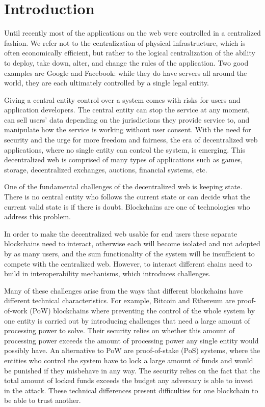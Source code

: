 \section{Introduction}
Until recently most of the applications on the web were controlled in a centralized fashion.
We refer not to the centralization of physical infrastructure, which is often economically efficient, but rather to the logical centralization of the ability to deploy, take down, alter, and change the rules of the application.
Two good examples are Google and Facebook: while they do have servers all around the world, they are each ultimately controlled by a single legal entity.

Giving a central entity control over a system comes with risks for users and application developers.
The central entity can stop the service at any moment, can sell users' data depending on the jurisdictions they provide service to, and manipulate how the service is working without user consent.
With the need for security and the urge for more freedom and fairness, the era of decentralized web applications, where no single entity can control the system, is emerging.
This decentralized web is comprised of many types of applications such as games, storage, decentralized exchanges, auctions, financial systems, etc.

One of the fundamental challenges of the decentralized web is keeping state. There is no central entity who follows the current state or can decide what the current valid state is if there is doubt.
Blockchains are one of technologies who address this problem.

In order to make the decentralized web usable for end users these separate blockchains need to interact, otherwise each will become isolated and not adopted by as many users, and the sum functionality of the system will be insufficient to compete with the centralized web.
However, to interact different chains need to build in interoperability mechanisms, which introduces challenges.

Many of these challenges arise from the ways that different blockchains have different technical characteristics. For example, Bitcoin and Ethereum are proof-of-work (PoW) blockchains where preventing the control of the whole system by one entity is carried out by introducing challenges that need a large amount of processing power to solve. Their security relies on whether this amount of processing power exceeds the amount of processing power any single entity would possibly have. An alternative to PoW are proof-of-stake (PoS) systems, where the entities who control the system have to lock a large amount of funds and would be punished if they misbehave in any way. The security relies on the fact that the total amount of locked funds exceeds the budget any adversary is able to invest in the attack. These technical differences present difficulties for one blockchain to be able to trust another.

